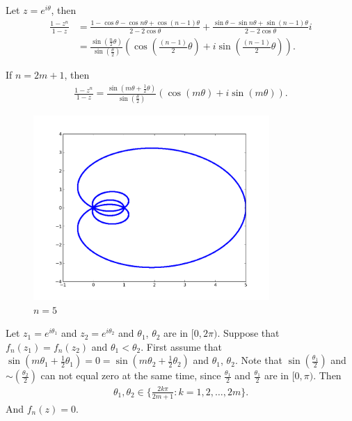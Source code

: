 \documentclass[a4paper,10pt]{amsart}
\begin{document}
Let $z = e^{i\theta}$, then
\begin{align*}
    \frac{1-z^{n}}{1-z} &= 
    \frac{1-\cos \theta - \cos n\theta + \cos(n-1)\theta}
    {2-2\cos \theta}
    + \frac{\sin \theta - \sin n\theta + \sin(n-1)\theta}
    {2-2\cos \theta} i \\
    &= \frac{\sin (\frac{n}{2}\theta)}
       {\sin (\frac{\theta}{2})} \left (
       \cos (\frac{(n-1)}{2}\theta) + i\sin (\frac{(n-1)}{2}\theta) \right).
\end{align*}

If $n = 2m + 1$, then
\begin{align*}
    \frac{1-z^{n}}{1-z} = 
    \frac{\sin (m\theta + \frac{1}{2}\theta)}
       {\sin (\frac{\theta}{2})} \left (
       \cos (m\theta) + i\sin (m\theta) \right).
\end{align*}

\begin{figure}
    \centering
    \includegraphics[width=0.8\textwidth]{zn5.png}
    \caption{$n=5$}
\end{figure}

Let $z_1 = e^{i\theta_1}$ and $z_2 = e^{i\theta_2}$ and
$\theta_1$, $\theta_2$ are in $[0, 2\pi)$. Suppose that 
$f_{n}(z_1) = f_{n}(z_2)$ and $\theta_1 < \theta_2$. 
First assume that $\sin (m\theta_1 + \frac{1}{2}\theta_1) = 0
= \sin (m\theta_2 + \frac{1}{2}\theta_2)$ and $\theta_1$, $\theta_2$.
Note that $\sin (\frac{\theta_1}{2})$ and $\sim (\frac{\theta_2}{2})$ can
not equal zero at the same time, since $\frac{\theta_1}{2}$ and 
$\frac{\theta_1}{2}$ are in $[0, \pi)$. Then
\begin{align*}
    \theta_1, \theta_2 \in \{\frac{2k\pi}{2m+1} : k = 1, 2, \ldots, 2m\}. 
\end{align*}
And $f_n(z) = 0$.
\end{document}
